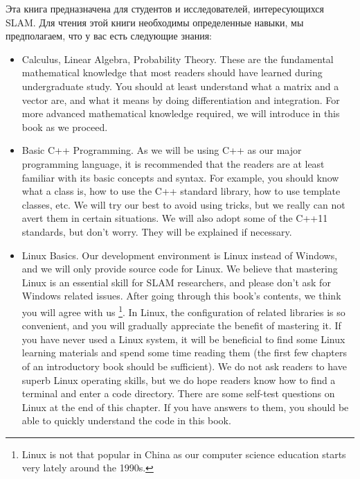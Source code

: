 \begin{Russian}
    Эта книга предназначена для студентов и исследователей, интересующихся SLAM. Для чтения этой книги необходимы определенные навыки, мы предполагаем, что у вас есть следующие знания:
\end{Russian}

\begin{English}
    \begin{itemize}
    	\item Calculus, Linear Algebra, Probability Theory. These are the fundamental mathematical knowledge that most readers should have learned during undergraduate study. You should at least understand what a matrix and a vector are, and what it means by doing differentiation and integration. For more advanced mathematical knowledge required, we will introduce in this book as we proceed.
     
    	\item Basic C++ Programming. As we will be using C++ as our major programming language, it is recommended that the readers are at least familiar with its basic concepts and syntax. For example, you should know what a class is, how to use the C++ standard library, how to use template classes, etc. We will try our best to avoid using tricks, but we really can not avert them in certain situations. We will also adopt some of the C++11 standards, but don't worry. They will be explained if necessary.
    
    	\item Linux Basics. Our development environment is Linux instead of Windows, and we will only provide source code for Linux. We believe that mastering Linux is an essential skill for SLAM researchers, and please  don't ask for Windows related issues. After going through this book's contents, we think you will agree with us \footnote{Linux is not that popular in China as our computer science education starts very lately around the 1990s.}. In Linux, the configuration of related libraries is so convenient, and you will gradually appreciate the benefit of mastering it. If you have never used a Linux system, it will be beneficial to find some Linux learning materials and spend some time reading them (the first few chapters of an introductory book should be sufficient). We do not ask readers to have superb Linux operating skills, but we do hope readers know how to find a terminal and enter a code directory. There are some self-test questions on Linux at the end of this chapter. If you have answers to them, you should be able to quickly understand the code in this book.
    \end{itemize}
\end{English}

